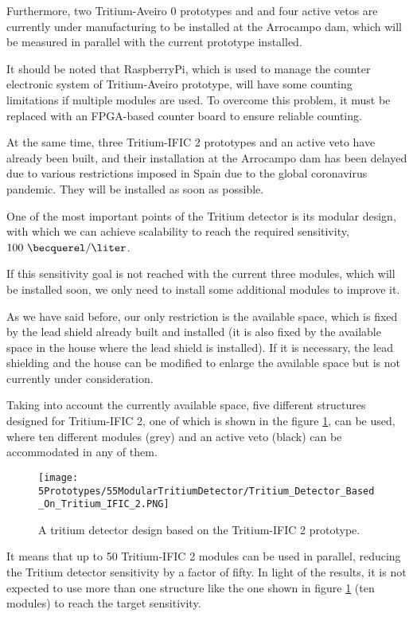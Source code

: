 Furthermore, two Tritium-Aveiro 0 prototypes and and four active vetos are currently under manufacturing to be installed at the Arrocampo dam, which will be measured in parallel with the current prototype installed.

It should be noted that RaspberryPi, which is used to manage the counter electronic system of Tritium-Aveiro prototype, will have some counting limitations if multiple modules are used. To overcome this problem, it must be replaced with an FPGA-based counter board to ensure reliable counting.

At the same time, three Tritium-IFIC 2 prototypes and an active veto have already been built, and their installation at the Arrocampo dam has been delayed due to various restrictions imposed in Spain due to the global coronavirus pandemic. They will be installed as soon as possible.

One of the most important points of the Tritium detector is its modular design, with which we can achieve scalability to reach the required sensitivity, $100~\becquerel/\liter$. 

If this sensitivity goal is not reached with the current three modules, which will be installed soon, we only need to install some additional modules to improve it.

As we have said before, our only restriction is the available space, which is fixed by the lead shield already built and installed (it is also fixed by the available space in the house where the lead shield is installed). If it is necessary, the lead shielding and the house can be modified to enlarge the available space but is not currently under consideration.

Taking into account the currently available space, five different structures designed for Tritium-IFIC 2, one of which is shown in the figure \ref{fig:TritiumMonitorIFIC2Design}, can be used, where ten different modules (grey) and an active veto (black) can be accommodated in any of them. 

\begin{figure}[h]
\centering
\texttt{[image: 5Prototypes/55ModularTritiumDetector/Tritium\_Detector\_Based\_On\_Tritium\_IFIC\_2.PNG]}
\caption{A tritium detector design based on the Tritium-IFIC 2 prototype.\label{fig:TritiumMonitorIFIC2Design}}
\end{figure}

It means that up to 50 Tritium-IFIC 2 modules can be used in parallel, reducing the Tritium detector sensitivity by a factor of fifty. In light of the results, it is not expected to use more than one structure like the one shown in figure \ref{fig:TritiumMonitorIFIC2Design} (ten modules) to reach the target sensitivity.